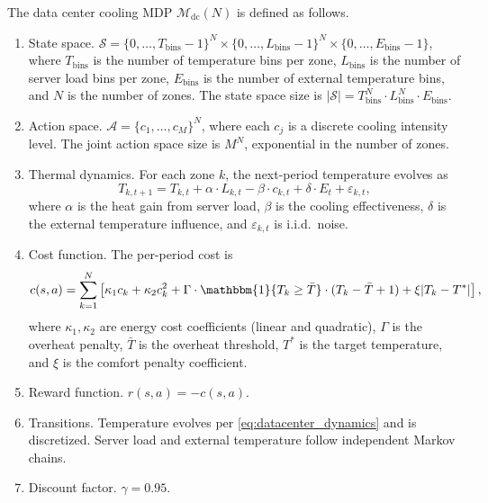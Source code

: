 \begin{definition}
\label{def:datacenter_mdp}
The data center cooling MDP $\mathcal{M}_{\mathrm{dc}}(N)$ is defined as follows.
\begin{enumerate}
    \item State space. $\mathcal{S} = \{0, \ldots, T_{\mathrm{bins}}-1\}^N \times \{0, \ldots, L_{\mathrm{bins}}-1\}^N \times \{0, \ldots, E_{\mathrm{bins}}-1\}$, where $T_{\mathrm{bins}}$ is the number of temperature bins per zone, $L_{\mathrm{bins}}$ is the number of server load bins per zone, $E_{\mathrm{bins}}$ is the number of external temperature bins, and $N$ is the number of zones. The state space size is $|\mathcal{S}| = T_{\mathrm{bins}}^N \cdot L_{\mathrm{bins}}^N \cdot E_{\mathrm{bins}}$.
    \item Action space. $\mathcal{A} = \{c_1, \ldots, c_M\}^N$, where each $c_j$ is a discrete cooling intensity level. The joint action space size is $M^N$, exponential in the number of zones.
    \item Thermal dynamics. For each zone $k$, the next-period temperature evolves as
    \begin{equation}
    \label{eq:datacenter_dynamics}
    T_{k,t+1} = T_{k,t} + \alpha \cdot L_{k,t} - \beta \cdot c_{k,t} + \delta \cdot E_t + \varepsilon_{k,t},
    \end{equation}
    where $\alpha$ is the heat gain from server load, $\beta$ is the cooling effectiveness, $\delta$ is the external temperature influence, and $\varepsilon_{k,t}$ is i.i.d.\ noise.
    \item Cost function. The per-period cost is
    \begin{equation}
    \label{eq:datacenter_cost}
    c(s, a) = \sum_{k=1}^{N} \left[ \kappa_1 c_k + \kappa_2 c_k^2 + \Gamma \cdot \mathbbm{1}\{T_k \geq \bar{T}\} \cdot (T_k - \bar{T} + 1) + \xi |T_k - T^*| \right],
    \end{equation}
    where $\kappa_1, \kappa_2$ are energy cost coefficients (linear and quadratic), $\Gamma$ is the overheat penalty, $\bar{T}$ is the overheat threshold, $T^*$ is the target temperature, and $\xi$ is the comfort penalty coefficient.
    \item Reward function. $r(s, a) = -c(s, a)$.
    \item Transitions. Temperature evolves per \eqref{eq:datacenter_dynamics} and is discretized. Server load and external temperature follow independent Markov chains.
    \item Discount factor. $\gamma = 0.95$.
\end{enumerate}
\end{definition}

